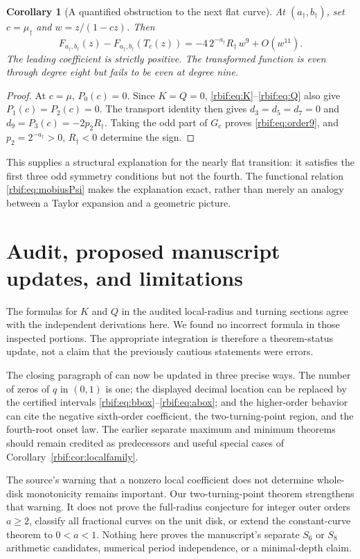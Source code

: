 \documentclass[11pt,a4paper]{article}
\newtheorem{corollary}[theorem]{Corollary}
\theoremstyle{definition}\newtheorem{definition}[theorem]{Definition}
\theoremstyle{remark}\newtheorem{remark}[theorem]{Remark}
\newcommand{\rbpa}{a_\dagger}
\newcommand{\rbpb}{b_\dagger}
\newcommand{\rbrr}{R_\dagger}
\newcommand{\rbmu}{\mu_\dagger}
\numberwithin{equation}{section}
\begin{document}
\begin{corollary}[A quantified obstruction to the next flat curve]
\label{rbif:cor:order9}
At $(\rbpa,\rbpb)$, set $c=\rbmu$ and $w=z/(1-cz)$. Then
\begin{equation}
 F_{\rbpa,\rbpb}(z)-F_{\rbpa,\rbpb}(T_c(z))
 =-4\,2^{-\rbpa}\rbrr\,w^9+O(w^{11}).
 \label{rbif:eq:order9}
\end{equation}
The leading coefficient is strictly positive. The transformed function
is even through degree eight but fails to be even at degree nine.
\end{corollary}
\begin{proof}
At $c=\mu$, $P_0(c)=0$. Since $K=Q=0$,
\eqref{rbif:eq:K}--\eqref{rbif:eq:Q} also give $P_1(c)=P_2(c)=0$.
The transport identity then gives $d_3=d_5=d_7=0$ and
$d_9=P_3(c)=-2p_2\rbrr$.
Taking the odd part of $G_c$ proves \eqref{rbif:eq:order9}, and
$p_2=2^{-\rbpa}>0$, $\rbrr<0$ determine the sign.
\end{proof}

This supplies a structural explanation for the nearly flat transition:
it satisfies the first three odd symmetry conditions but not the fourth.
The functional relation \eqref{rbif:eq:mobiusPsi} makes the explanation
exact, rather than merely an analogy between a Taylor expansion and a
geometric picture.

\section{Audit, proposed manuscript updates, and limitations}
\label{rbif:sec:audit}
The formulas for $K$ and $Q$ in the audited local-radius and turning
sections agree with the independent derivations here. We found no
incorrect formula in those inspected portions. The appropriate
integration is therefore a theorem-status update, not a claim that the
previously cautious statements were errors.

The closing paragraph of  can now be updated
in three precise ways. The number of zeros of $q$ in $(0,1)$ is one;
the displayed decimal location can be replaced by the certified intervals
\eqref{rbif:eq:bbox}--\eqref{rbif:eq:abox}; and the higher-order behavior
can cite the negative sixth-order coefficient, the two-turning-point
region, and the fourth-root onset law. The earlier separate maximum and
minimum theorems should remain credited as predecessors and useful
special cases of Corollary~\ref{rbif:cor:localfamily}.

The source's warning that a nonzero local coefficient does not determine
whole-disk monotonicity remains important. Our two-turning-point theorem
strengthens that warning. It does not prove the full-radius conjecture
for integer outer orders $a\ge2$, classify all fractional curves on the
unit disk, or extend the constant-curve theorem to $0<a<1$.
Nothing here proves the manuscript's separate $S_6$ or $S_8$ arithmetic
candidates, numerical period independence, or a minimal-depth claim.
\end{document}
